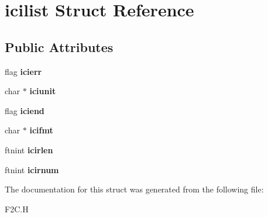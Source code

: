 \hypertarget{structicilist}{\section{icilist Struct Reference}
\label{structicilist}
}
\subsection*{Public Attributes}
\begin{DoxyCompactItemize}
\item 
\hypertarget{structicilist_aee2f6c57bb6df08adfc9d62a185f999a}{flag {\bfseries icierr}}\label{structicilist_aee2f6c57bb6df08adfc9d62a185f999a}

\item 
\hypertarget{structicilist_a4da4c2525fa8e39989ddc28f99b86b13}{char $\ast$ {\bfseries iciunit}}\label{structicilist_a4da4c2525fa8e39989ddc28f99b86b13}

\item 
\hypertarget{structicilist_a598f4d4f880c560238c7a32f5dcb3e51}{flag {\bfseries iciend}}\label{structicilist_a598f4d4f880c560238c7a32f5dcb3e51}

\item 
\hypertarget{structicilist_a3689b68768a386cbcc460eb2632118e9}{char $\ast$ {\bfseries icifmt}}\label{structicilist_a3689b68768a386cbcc460eb2632118e9}

\item 
\hypertarget{structicilist_ac6025ddf8b1ade5cb73d607dd2d30501}{ftnint {\bfseries icirlen}}\label{structicilist_ac6025ddf8b1ade5cb73d607dd2d30501}

\item 
\hypertarget{structicilist_a6e4cb8719f1c76ee87273671448da892}{ftnint {\bfseries icirnum}}\label{structicilist_a6e4cb8719f1c76ee87273671448da892}

\end{DoxyCompactItemize}


The documentation for this struct was generated from the following file\+:\begin{DoxyCompactItemize}
\item 
F2\+C.\+H\end{DoxyCompactItemize}
